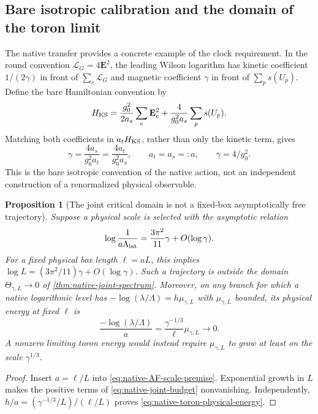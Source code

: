 \documentclass[11pt,oneside,openany]{book}
\newtheorem{proposition}[proposition]{Proposition}
\theoremstyle{definition}
\theoremstyle{remark}
\begin{document}
\subsection{Bare isotropic calibration and the domain of the toron limit}
\label{sec:native-bare-calibration}
The native transfer provides a concrete example of the clock
requirement. In the round convention
$\mathcal L_G=4\mathbf E^2$, the leading Wilson logarithm has
kinetic coefficient $1/(2\gamma)$ in front of
$\sum_e\mathcal L_G$ and magnetic coefficient $\gamma$ in front
of $\sum_ps(U_p)$. Define the bare Hamiltonian convention by
\begin{equation}
 H_{\rm KS}
   =\frac{g_0^2}{2a_s}\sum_e\mathbf E_e^2
                  +\frac4{g_0^2a_s}\sum_ps(U_p).
 \label{eq:native-bare-Hamiltonian-convention}
\end{equation}
Matching both coefficients in $a_tH_{\rm KS}$, rather than only
the kinetic term, gives
\begin{equation}
 \gamma=\frac{4a_s}{g_0^2a_t}
        =\frac{4a_t}{g_0^2a_s},
 \qquad a_t=a_s=:a,\qquad \gamma=4/g_0^2.
 \label{eq:native-bare-isotropic-calibration}
\end{equation}
This is the bare isotropic convention of the native action, not an
independent construction of a renormalized physical observable.

\begin{proposition}[The joint critical domain is not a fixed-box
asymptotically free trajectory]
\label{prop:native-physical-domain-separation}
Suppose a physical scale is selected with the asymptotic relation
\begin{equation}
 \log\frac1{a\Lambda_{\rm lat}}
               =\frac{3\pi^2}{11}\gamma+O(\log\gamma).
 \label{eq:native-AF-scale-premise}
\end{equation}
For a fixed physical box length $\ell=aL$, this implies
$\log L=(3\pi^2/11)\gamma+O(\log\gamma)$. Such a trajectory is
outside the domain $\Theta_{\gamma,L}\to0$ of
\cref{thm:native-joint-spectrum}.
Moreover, on any branch for which a native logarithmic level has
$-\log(\lambda/\Lambda)=h\mu_{\gamma,L}$ with
$\mu_{\gamma,L}$ bounded, its physical energy at fixed $\ell$ is
\begin{equation}
 \frac{-\log(\lambda/\Lambda)}a
          =\frac{\gamma^{-1/3}}\ell\mu_{\gamma,L}
                                                     \longrightarrow0.
 \label{eq:native-toron-physical-energy}
\end{equation}
A nonzero limiting toron energy would instead require
$\mu_{\gamma,L}$ to grow at least on the scale $\gamma^{1/3}$.
\end{proposition}
\begin{proof}
Insert $a=\ell/L$ into \cref{eq:native-AF-scale-premise}.
Exponential growth in $L$ makes the positive terms of
\cref{eq:native-joint-budget} nonvanishing. Independently,
$h/a=(\gamma^{-1/3}/L)/(\ell/L)$ proves
\cref{eq:native-toron-physical-energy}.
\end{proof}
\end{document}
